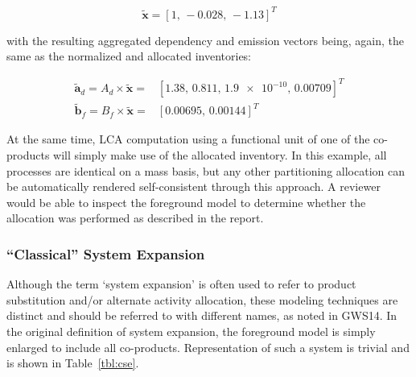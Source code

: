 \begin{equation}
  \tilde{\mathbf{x}} = [1,\,-0.028,\,-1.13]^T
\end{equation}

with the resulting aggregated dependency and emission vectors being, again, the same as the normalized and allocated inventories:

\begin{eqnarray}
  \tilde{\mathbf{a}}_d = A_d\times \tilde{\mathbf{x}} = & [1.38,\, 0.811,\,\num{1.9e-10},\,0.00709]^T \\
  \tilde{\mathbf{b}}_f = B_f\times \tilde{\mathbf{x}} = & [0.00695,\, 0.00144]^T
\end{eqnarray}

At the same time, LCA computation using a functional unit of one of the co-products will simply make use of the allocated inventory.  In this example, all processes are identical on a mass basis, but any other partitioning allocation can be automatically rendered self-consistent through this approach.  A reviewer would be able to inspect the foreground model to determine whether the allocation was performed as described in the report.

\subsubsection{``Classical'' System Expansion}

Although the term `system expansion' is often used to refer to product substitution and/or alternate activity allocation, these modeling techniques are distinct and should be referred to with different names, as noted in GWS14.  In the original definition of system expansion, the foreground model is simply enlarged to include all co-products.  Representation of such a system is trivial and is shown in Table~\ref{tbl:cse}.

